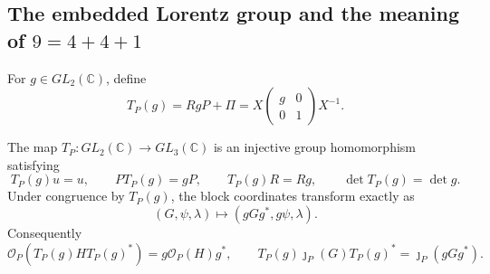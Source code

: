 \subsection{The embedded Lorentz group and the meaning of
\texorpdfstring{\(9=4+4+1\)}{9=4+4+1}}
\label{hlob:subsec:lorentz-action}

For \(g\in GL_2(\mathbb C)\), define
\begin{equation}
 T_P(g)=RgP+\Pi
 =X\begin{pmatrix}g&0\\0&1\end{pmatrix}X^{-1}.
 \label{hlob:eq:Tg}
\end{equation}

\begin{theorem}
\label{hlob:thm:lorentz-action}
The map \(T_P:GL_2(\mathbb C)\to GL_3(\mathbb C)\) is an injective group
homomorphism satisfying
\begin{equation}
 T_P(g)u=u,\qquad
 PT_P(g)=gP,\qquad
 T_P(g)R=Rg,\qquad
 \det T_P(g)=\det g.
 \label{hlob:eq:Tg-identities}
\end{equation}
Under congruence by \(T_P(g)\), the block coordinates transform exactly as
\begin{equation}
 (G,\psi,\lambda)\longmapsto
 (gGg^*,g\psi,\lambda).
 \label{hlob:eq:block-action}
\end{equation}
Consequently
\begin{equation}
 \mathcal O_P(T_P(g)HT_P(g)^*)
 =g\mathcal O_P(H)g^*,
 \qquad
 T_P(g)\jmath_P(G)T_P(g)^*=\jmath_P(gGg^*).
 \label{hlob:eq:equivariance}
\end{equation}


\end{theorem}
